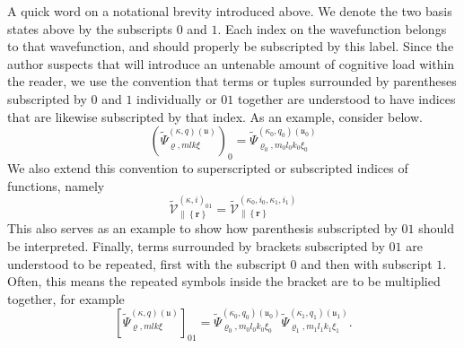 A quick word on a notational brevity introduced above. We denote the two basis
states above by the subscripts $0$ and $1$. Each index on the wavefunction
belongs to that wavefunction, and should properly be subscripted by this label.
Since the author suspects that will introduce an untenable amount of cognitive
load within the reader, we use the convention that terms or tuples surrounded by
parentheses subscripted by $0$ and $1$ individually or $01$ together are
understood to have indices that are likewise subscripted by that index. As an
example, consider below.
\begin{equation}
\left(
    \tilde{\Psi}
    _{\varrho,mlk\xi}^{\left(\kappa,q\right)\left(\mathfrak{u}\right)}
\right)_{0}
    =
        \tilde{\Psi}
        _{
            \varrho_{0},m_{0}l_{0}k_{0}
            \xi_{0}}^{\left(\kappa_{0},q_{0}\right)\left(\mathfrak{u}_{0}\right)
        }
\end{equation}
We also extend this convention to superscripted or subscripted indices of
functions, namely
\begin{equation}
\tilde{\mathcal{V}}_{\parallel\left\{\bm{r}\right\}}
^{\left(\kappa,i\right)_{01}}
    =
        \tilde{\mathcal{V}}_{\parallel\left\{\bm{r}\right\}}
        ^{\left(\kappa_{0},i_{0},\kappa_{1},i_{1}\right)}
\end{equation}
This also serves as an example to show how parenthesis subscripted by $01$
should be interpreted. Finally, terms surrounded by brackets subscripted by $01$
are understood to be repeated, first with the subscript $0$ and then with
subscript $1$. Often, this means the repeated symbols inside the bracket are to
be multiplied together, for example
\begin{equation}
\left[
    \tilde{\Psi}
    _{\varrho,mlk\xi}^{\left(\kappa,q\right)\left(\mathfrak{u}\right)}
\right]_{01}
    =
        \tilde{\Psi}
        _{
            \varrho_{0},m_{0}l_{0}k_{0}
            \xi_{0}}
                ^{\left(\kappa_{0},q_{0}\right)\left(\mathfrak{u}_{0}\right)
        }
        \tilde{\Psi}
        _{
            \varrho_{1},m_{1}l_{1}k_{1}
            \xi_{1}}
                ^{\left(\kappa_{1},q_{1}\right)\left(\mathfrak{u}_{1}\right)
        }
.
\end{equation}

